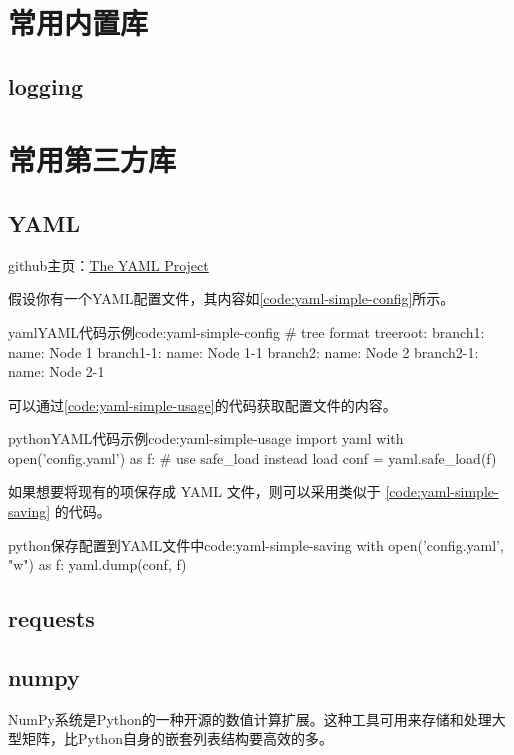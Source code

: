 \section{常用内置库}

\subsection{logging}


\section{常用第三方库}

\subsection{YAML}
github主页：\href{https://github.com/yaml}{The YAML Project}

假设你有一个YAML配置文件，其内容如\ref{code:yaml-simple-config}所示。

\begin{jcode}{yaml}{YAML代码示例}{code:yaml-simple-config}
# tree format
treeroot:
    branch1:
        name: Node 1
        branch1-1:
            name: Node 1-1
    branch2:
        name: Node 2
        branch2-1:
            name: Node 2-1
\end{jcode}

可以通过\ref{code:yaml-simple-usage}的代码获取配置文件的内容。

\begin{jcode}{python}{YAML代码示例}{code:yaml-simple-usage}
import yaml
with open('config.yaml') as f:
    # use safe_load instead load
    conf = yaml.safe_load(f)
\end{jcode}

如果想要将现有的项保存成 YAML 文件，则可以采用类似于 \ref{code:yaml-simple-saving} 的代码。
\begin{jcode}{python}{保存配置到YAML文件中}{code:yaml-simple-saving}
with open('config.yaml', "w") as f:
    yaml.dump(conf, f)
\end{jcode}

\subsection{requests}

\subsection{numpy}
NumPy系统是Python的一种开源的数值计算扩展。这种工具可用来存储和处理大型矩阵，比Python自身的嵌套列表结构要高效的多。

